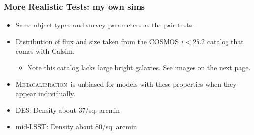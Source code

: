 \documentclass{beamer}
\newcommand{\Mcal}{\textsc{Metacalibration}}
\newcommand{\neff}{$n_{eff}$}
\begin{document}
\frame
{
    \frametitle{More Realistic Tests: my own sims}

 
    \begin{itemize}

        \item Same object types and survey parameters as the pair tests.

        \item Distribution of flux and size taken from the COSMOS $i<25.2$ catalog
            that comes with Galsim.
            \begin{itemize}
                \item Note this catalog lacks large bright galaxies. See images
                    on the next page.
            \end{itemize}

        \item \Mcal\ is unbiased for models with these properties when they
            appear individually.

        \item {\color{lightsteelblue} DES}: Density about 37/sq. arcmin
            
        \item {\color{lightsteelblue} mid-LSST}: Density about 80/sq. arcmin

    \end{itemize}

}
\end{document}
